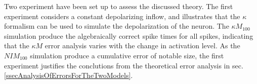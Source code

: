 Two experiment have been set up to assess the discussed theory.
The first experiment considers a constant depolarizing inflow, and illustrates that the $\kappa$ formalism can be used to simulate the depolarization of the neuron. %
The $\kappa M_{100}$ simulation produce the algebraically correct spike times for all spikes, 
	indicating that the $\kappa M$ error analysis varies with the change in activation level.
As the $NIM_{100}$ simulation produce a cumulative error of notable size, the first experiment justifies the conclutions from the theoretical error analysis in sec. \ref{ssecAnalysisOfErrorsForTheTwoModels}.


